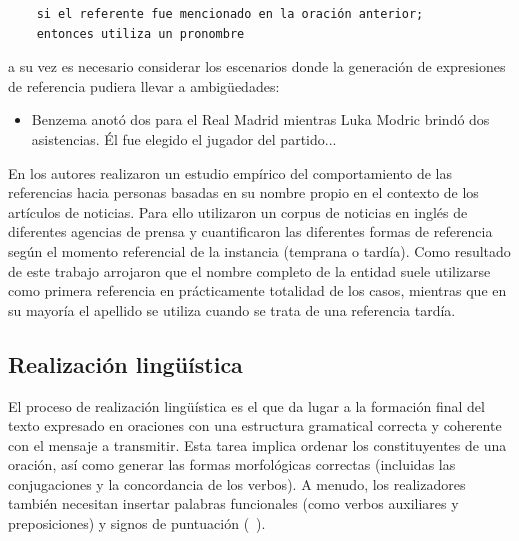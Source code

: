 \begin{verbatim}
    si el referente fue mencionado en la oración anterior;
    entonces utiliza un pronombre
\end{verbatim}

a su vez es necesario considerar los escenarios donde la generaci\'on de expresiones de referencia pudiera llevar a ambigüedades:

\begin{itemize}
    \item Benzema anotó dos para el Real Madrid mientras Luka Modric brindó dos asistencias. Él fue elegido el jugador del partido... 
\end{itemize}

    En \cite{siddharthan2011information} los autores realizaron un estudio emp\'irico del comportamiento de las referencias hacia personas basadas en 
su nombre propio en el contexto de los art\'iculos de noticias. Para ello utilizaron un corpus de noticias en inglés de diferentes agencias de prensa y 
cuantificaron las diferentes formas de referencia seg\'un el momento referencial de la instancia (temprana o tard\'ia). Como resultado de este trabajo 
arrojaron que el nombre completo de la entidad suele utilizarse como primera referencia en pr\'acticamente totalidad de los casos, mientras que en su mayor\'ia
el apellido se utiliza cuando se trata de una referencia tard\'ia. 


\subsection{Realización lingüística}\label{subsection:realizcion}

    El proceso de realizaci\'on lingüística es el que da lugar a la formaci\'on final del texto expresado en oraciones con una 
estructura gramatical correcta y coherente con el mensaje a transmitir. Esta tarea implica ordenar los constituyentes de una oración, 
así como generar las formas morfológicas correctas (incluidas las conjugaciones y la concordancia de los verbos). A menudo, los 
realizadores también necesitan insertar palabras funcionales (como verbos auxiliares y preposiciones) y signos de puntuación (~\cite{Gatt2018SurveyOT}).
   

